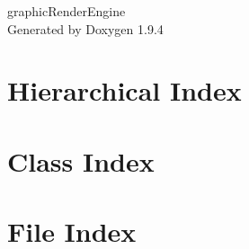 \documentclass[twoside]{book}
\newcommand{\+}{\discretionary{\mbox{\scriptsize$\hookleftarrow$}}{}{}}
\newcommand{\clearemptydoublepage}{%
    \newpage{\pagestyle{empty}\cleardoublepage}%
  }
\begin{document}
  \raggedbottom
    \hypersetup{pageanchor=false,
                bookmarksnumbered=true,
                pdfencoding=unicode
               }
  \begin{titlepage}
  \vspace*{7cm}
  \begin{center}%
  {\Large graphic\+Render\+Engine}\\
  \vspace*{1cm}
  {\large Generated by Doxygen 1.9.4}\\
  \end{center}
  \end{titlepage}
  \clearemptydoublepage
  \tableofcontents
  \clearemptydoublepage
  \hypersetup{pageanchor=true}
\chapter{Hierarchical Index}

\chapter{Class Index}

\chapter{File Index}

\end{document}
